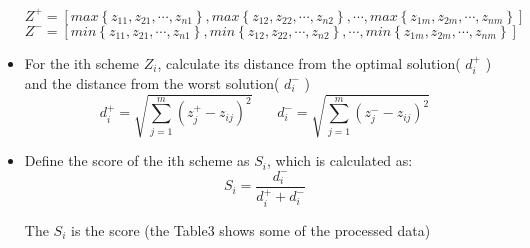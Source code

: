 \begin{itemize}
\begin{equation}
    Z^{+} =[max\left \{ z_{11},z_{21},\cdots ,z_{n1} \right \} ,max\left \{ z_{12},z_{22},\cdots ,z_{n2} \right \},\cdots ,max\left \{ z_{1m},z_{2m},\cdots ,z_{nm} \right \}]
\end{equation}
\begin{equation}
Z^{-} =[min\left \{ z_{11},z_{21},\cdots ,z_{n1} \right \} ,min\left \{ z_{12},z_{22},\cdots ,z_{n2} \right \},\cdots ,min\left \{ z_{1m},z_{2m},\cdots ,z_{nm} \right \}]
\end{equation}
\item For the ith scheme \(Z_{i}\), calculate its distance from the optimal solution( \(d_{i}^{+}\) ) and the distance from the worst solution( \(d_{i}^{-}\) )
\begin{equation}
d^{+}_{i}=\sqrt{\sum_{j=1}^{m}{(z^{+}_{j}-z_{ij})^{2}} }
\ \ \ \ \ \ \ \ 
d^{-}_{i}=\sqrt{\sum_{j=1}^{m}{(z^{-}_{j}-z_{ij})^{2}} }
\end{equation}
\item Define the score of the ith scheme as \(S_{i}\), which is calculated as:
\begin{equation}
    S_{i}=\frac{d^{-}_{i}}{d^{+}_{i}+d^{-}_{i}}
\end{equation}

The \(S_{i}\) is the score (the Table3 shows some of the processed data)


\end{itemize}
